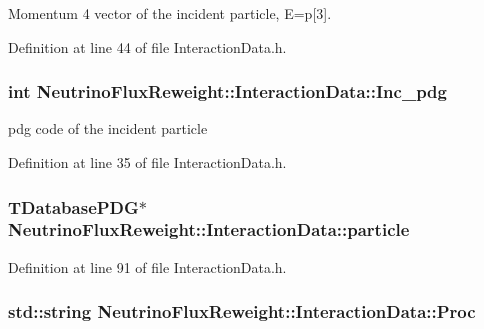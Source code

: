 Momentum 4 vector of the incident particle, E=p\mbox{[}3\mbox{]}. 



Definition at line 44 of file Interaction\-Data.\-h.

\hypertarget{class_neutrino_flux_reweight_1_1_interaction_data_a3dd2f3bb4bc4d092b7ec53906c00473e}{
\subsubsection[{Inc\-\_\-pdg}]{\setlength{\rightskip}{0pt plus 5cm}int Neutrino\-Flux\-Reweight\-::\-Interaction\-Data\-::\-Inc\-\_\-pdg}}\label{class_neutrino_flux_reweight_1_1_interaction_data_a3dd2f3bb4bc4d092b7ec53906c00473e}


pdg code of the incident particle 



Definition at line 35 of file Interaction\-Data.\-h.

\hypertarget{class_neutrino_flux_reweight_1_1_interaction_data_a18c64cbdb5ca45143f1e97de157d7f99}{
\subsubsection[{particle}]{\setlength{\rightskip}{0pt plus 5cm}T\-Database\-P\-D\-G$\ast$ Neutrino\-Flux\-Reweight\-::\-Interaction\-Data\-::particle\hspace{0.3cm}{\ttfamily [private]}}}\label{class_neutrino_flux_reweight_1_1_interaction_data_a18c64cbdb5ca45143f1e97de157d7f99}


Definition at line 91 of file Interaction\-Data.\-h.

\hypertarget{class_neutrino_flux_reweight_1_1_interaction_data_aee459302760758f034a4e045fed9d6af}{
\subsubsection[{Proc}]{\setlength{\rightskip}{0pt plus 5cm}std\-::string Neutrino\-Flux\-Reweight\-::\-Interaction\-Data\-::\-Proc}}\label{class_neutrino_flux_reweight_1_1_interaction_data_aee459302760758f034a4e045fed9d6af}


